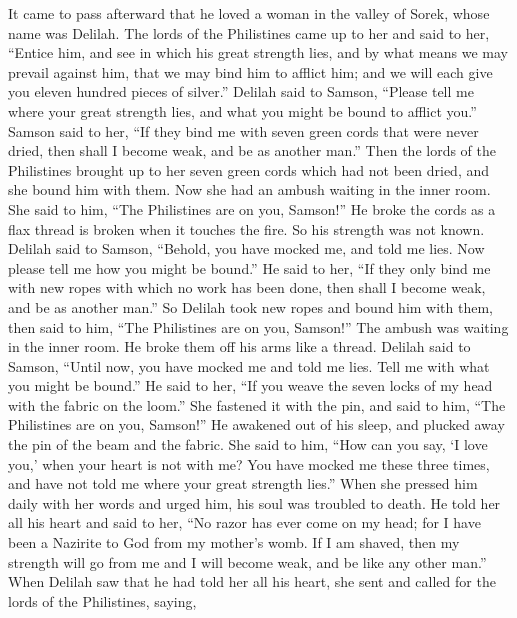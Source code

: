 \begin{paracol}{2}
\begin{otherlanguage}{english}
 It came to pass afterward that he loved a woman in the
valley of Sorek, whose name was Delilah.  The lords of the
Philistines came up to her and said to her, ``Entice him, and see in
which his great strength lies, and by what means we may prevail against
him, that we may bind him to afflict him; and we will each give you
eleven hundred pieces of silver.''  Delilah said to
Samson, ``Please tell me where your great strength lies, and what you
might be bound to afflict you.''  Samson said to her, ``If
they bind me with seven green cords that were never dried, then shall I
become weak, and be as another man.''  Then the lords of
the Philistines brought up to her seven green cords which had not been
dried, and she bound him with them.  Now she had an ambush
waiting in the inner room. She said to him, ``The Philistines are on
you, Samson!'' He broke the cords as a flax thread is broken when it
touches the fire. So his strength was not known.  Delilah
said to Samson, ``Behold, you have mocked me, and told me lies. Now
please tell me how you might be bound.''  He said to her,
``If they only bind me with new ropes with which no work has been done,
then shall I become weak, and be as another man.''  So
Delilah took new ropes and bound him with them, then said to him, ``The
Philistines are on you, Samson!'' The ambush was waiting in the inner
room. He broke them off his arms like a thread.  Delilah
said to Samson, ``Until now, you have mocked me and told me lies. Tell
me with what you might be bound.'' He said to her, ``If you weave the
seven locks of my head with the fabric on the loom.'' 
She fastened it with the pin, and said to him, ``The Philistines are on
you, Samson!'' He awakened out of his sleep, and plucked away the pin of
the beam and the fabric.  She said to him, ``How can you
say, `I love you,' when your heart is not with me? You have mocked me
these three times, and have not told me where your great strength
lies.''  When she pressed him daily with her words and
urged him, his soul was troubled to death.  He told her
all his heart and said to her, ``No razor has ever come on my head; for
I have been a Nazirite to God from my mother's womb. If I am shaved,
then my strength will go from me and I will become weak, and be like any
other man.''  When Delilah saw that he had told her all
his heart, she sent and called for the lords of the Philistines, saying,

\end{otherlanguage}
\end{paracol}
